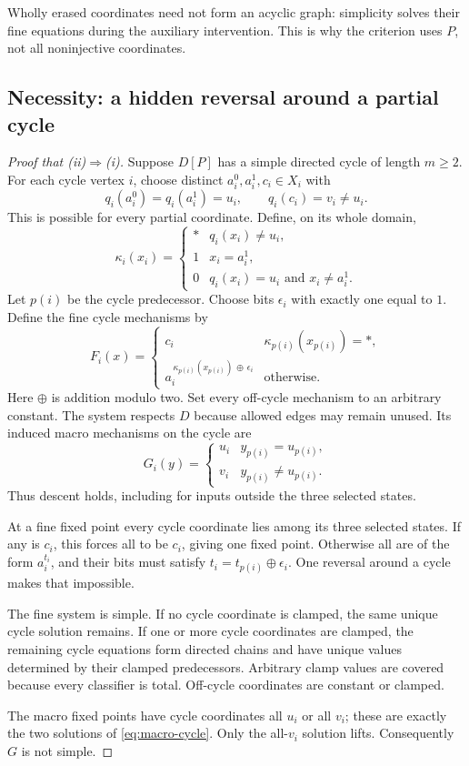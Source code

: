 \documentclass[11pt,a4paper]{article}
\theoremstyle{definition}
\theoremstyle{remark}
\begin{document}
Wholly erased coordinates need not form an acyclic graph: simplicity solves their fine equations during the auxiliary intervention. This is why the criterion uses $P$, not all noninjective coordinates.

\subsection{Necessity: a hidden reversal around a partial cycle}

\begin{proof}[Proof that (ii)$\Rightarrow$(i)]
Suppose $D[P]$ has a simple directed cycle of length $m\ge2$. For each cycle vertex $i$, choose distinct $a_i^0,a_i^1,c_i\in X_i$ with
\[
 q_i(a_i^0)=q_i(a_i^1)=u_i,\qquad q_i(c_i)=v_i\ne u_i.
\]
This is possible for every partial coordinate. Define, on its whole domain,
\[
 \kappa_i(x_i)=
 \begin{cases}
 *&q_i(x_i)\ne u_i,\\
 1&x_i=a_i^1,\\
 0&q_i(x_i)=u_i\text{ and }x_i\ne a_i^1.
 \end{cases}
\]
Let $p(i)$ be the cycle predecessor. Choose bits $\epsilon_i$ with exactly one equal to $1$. Define the fine cycle mechanisms by
\[
 F_i(x)=
 \begin{cases}
 c_i&\kappa_{p(i)}(x_{p(i)})=*,\\
 a_i^{\,\kappa_{p(i)}(x_{p(i)})\,\oplus\,\epsilon_i}&\text{otherwise}.
 \end{cases}
\]
Here $\oplus$ is addition modulo two. Set every off-cycle mechanism to an arbitrary constant. The system respects $D$ because allowed edges may remain unused. Its induced macro mechanisms on the cycle are
\begin{equation}\label{eq:macro-cycle}
 G_i(y)=\begin{cases}u_i&y_{p(i)}=u_{p(i)},\\v_i&y_{p(i)}\ne u_{p(i)}.\end{cases}
\end{equation}
Thus descent holds, including for inputs outside the three selected states.

At a fine fixed point every cycle coordinate lies among its three selected states. If any is $c_i$, this forces all to be $c_i$, giving one fixed point. Otherwise all are of the form $a_i^{t_i}$, and their bits must satisfy $t_i=t_{p(i)}\oplus\epsilon_i$. One reversal around a cycle makes that impossible.

The fine system is simple. If no cycle coordinate is clamped, the same unique cycle solution remains. If one or more cycle coordinates are clamped, the remaining cycle equations form directed chains and have unique values determined by their clamped predecessors. Arbitrary clamp values are covered because every classifier is total. Off-cycle coordinates are constant or clamped.

The macro fixed points have cycle coordinates all $u_i$ or all $v_i$; these are exactly the two solutions of \eqref{eq:macro-cycle}. Only the all-$v_i$ solution lifts. Consequently $G$ is not simple.
\end{proof}
\end{document}
